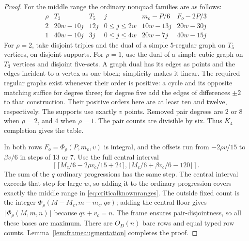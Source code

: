 \documentclass[11pt]{article}
\begin{document}
\begin{proof}
For the middle range the ordinary nonquad families are as follows:
\[
\begin{array}{c|c|c|c|c|c}
 \rho&T_3&T_5&j&m_o-P/6&F_o-2P/3\\ \hline
 2&20w-10j&12j&0\le j\le2w&10w-13j&20w-30j\\
 1&40w-10j&3j&0\le j\le4w&20w-7j&40w-15j
\end{array}
\]
For $\rho=2$, take disjoint triples and the dual of a simple
5-regular graph on $T_5$ vertices, on disjoint supports.
For $\rho=1$, use the dual of a simple cubic graph on $T_3$ vertices
and disjoint five-sets. A graph dual has its edges as points and the
edges incident to a vertex as one block; simplicity makes it linear.
The required regular graphs exist whenever their order is positive:
a cycle and its opposite matching suffice for degree three; for degree
five add the edges of differences $\pm2$ to that construction.
Their positive orders here are at least ten and twelve, respectively.
The supports use exactly $v$ points. Removed pair degrees are $2$ or $8$
when $\rho=2$, and $4$ when $\rho=1$. The pair counts are divisible by
six. Thus $K_4$ completion gives the table.

In both rows $F_o=\Phi_\rho(P,m_o,v)$ is integral, and the offsets run
from $-2\rho v/15$ to $\beta v/6$ in steps of 13 or 7.
Use the full central interval
\[
 [\lceil M_c/6-2\rho v_c/15+24\rceil,
   \lfloor M_c/6+\beta v_c/6-120\rfloor].
\]
The sum of the $q$ ordinary progressions has the same step.
The central interval exceeds that step for large $w$, so adding it to the ordinary
progression covers exactly the middle range in
\eqref{eq:criticalknownranges}.
The outside fixed count is the integer
$\Phi_\rho(M-M_c,m-m_c,qv)$; adding the central floor gives
$\lfloor\Phi_\rho(M,m,n)\rfloor$ because $qv+v_c=n$.
The frame ensures pair-disjointness, so all these bases are maximum.
There are $O_D(n)$ bare rows and equal typed row counts.
Lemma~\ref{lem:frameaugmentation} completes the proof.
\end{proof}
\end{document}
